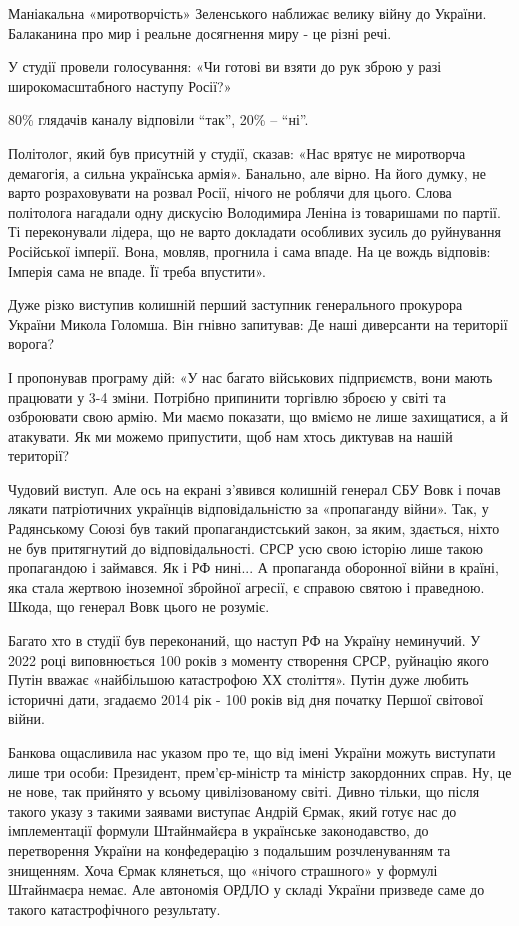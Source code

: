 Маніакальна «миротворчість» Зеленського наближає велику війну до України.
Балаканина про мир і реальне досягнення миру - це різні речі.

У студії провели голосування: «Чи готові ви взяти до рук зброю у разі
широкомасштабного наступу Росії?»

80\% глядачів каналу відповіли \enquote{так}, 20\% – \enquote{ні}.

Політолог, який був присутній у студії, сказав: «Нас врятує не миротворча
демагогія, а сильна українська армія». Банально, але вірно. На його думку, не
варто розраховувати на розвал Росії, нічого не роблячи для цього. Слова
політолога нагадали одну дискусію Володимира Леніна із товаришами по партії. Ті
переконували лідера, що не варто докладати особливих зусиль до руйнування
Російської імперії. Вона, мовляв, прогнила і сама впаде. На це вождь відповів:
Імперія сама не впаде. Її треба впустити».

Дуже різко виступив колишній перший заступник генерального прокурора України
Микола Голомша. Він гнівно запитував: Де наші диверсанти на території ворога?

І пропонував програму дій: «У нас багато військових підприємств, вони мають
працювати у 3-4 зміни. Потрібно припинити торгівлю зброєю у світі та озброювати
свою армію. Ми маємо показати, що вміємо не лише захищатися, а й атакувати. Як
ми можемо припустити, щоб нам хтось диктував на нашій території?

Чудовий виступ. Але ось на екрані з'явився колишній генерал СБУ Вовк і почав
лякати патріотичних українців відповідальністю за «пропаганду війни». Так, у
Радянському Союзі був такий пропагандистський закон, за яким, здається, ніхто
не був притягнутий до відповідальності. СРСР усю свою історію лише такою
пропагандою і займався. Як і РФ нині... А пропаганда оборонної війни в країні,
яка стала жертвою іноземної збройної агресії, є справою святою і праведною.
Шкода, що генерал Вовк цього не розуміє.

Багато хто в студії був переконаний, що наступ РФ на Україну неминучий. У 2022
році виповнюється 100 років з моменту створення СРСР, руйнацію якого Путін
вважає «найбільшою катастрофою ХХ століття». Путін дуже любить історичні дати,
згадаємо 2014 рік - 100 років від дня початку Першої світової війни.

Банкова ощасливила нас указом про те, що від імені України можуть виступати
лише три особи: Президент, прем'єр-міністр та міністр закордонних справ. Ну, це
не нове, так прийнято у всьому цивілізованому світі. Дивно тільки, що після
такого указу з такими заявами виступає Андрій Єрмак, який готує нас до
імплементації формули Штайнмайєра в українське законодавство, до перетворення
України на конфедерацію з подальшим розчленуванням та знищенням. Хоча Єрмак
клянеться, що «нічого страшного» у формулі Штайнмаєра немає. Але автономія
ОРДЛО у складі України призведе саме до такого катастрофічного результату.

